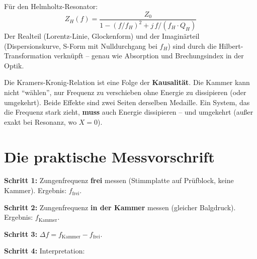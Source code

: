 \documentclass[11pt,a4paper]{article}
\begin{document}
Für den Helmholtz-Resonator:
\begin{equation}
Z_H(f) = \frac{Z_0}{1 - (f/f_H)^2 + j\,f/(f_H \cdot Q_H)}
\end{equation}
Der Realteil (Lorentz-Linie, Glockenform) und der Imaginärteil (Dispersionskurve, S-Form mit Nulldurchgang bei $f_H$) sind durch die Hilbert-Transformation verknüpft -- genau wie Absorption und Brechungsindex in der Optik.

\begin{keybox}
Die Kramers-Kronig-Relation ist eine Folge der \textbf{Kausalität}. Die Kammer kann nicht ``wählen'', nur Frequenz zu verschieben ohne Energie zu dissipieren (oder umgekehrt). Beide Effekte sind zwei Seiten derselben Medaille. Ein System, das die Frequenz stark zieht, \textbf{muss} auch Energie dissipieren -- und umgekehrt (außer exakt bei Resonanz, wo $X = 0$).
\end{keybox}

\section{Die praktische Messvorschrift}

\textbf{Schritt 1:} Zungenfrequenz \textbf{frei} messen (Stimmplatte auf Prüfblock, keine Kammer). Ergebnis: $f_\text{frei}$.

\textbf{Schritt 2:} Zungenfrequenz \textbf{in der Kammer} messen (gleicher Balgdruck). Ergebnis: $f_\text{Kammer}$.

\textbf{Schritt 3:} $\Delta f = f_\text{Kammer} - f_\text{frei}$.

\textbf{Schritt 4:} Interpretation:

\begin{table}[H]
\centering\small
{}
\caption{Interpretationsschlüssel: $\Delta f \to$ Ansprache-Prognose}
\end{table}
\end{document}
